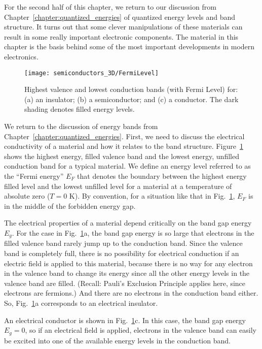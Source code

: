 For the second half of this chapter, we return to our discussion from
Chapter~\ref{chapter:quantized_energies} of quantized energy levels
and band structure. It turns out that some clever manipulations of
these materials can result in some really important electronic
components. The material in this chapter is the basis behind some of
the most important developments in modern electronics.

\begin{figure}
\begin{center}
\texttt{[image: semiconductors\_3D/FermiLevel]}
\end{center}
\caption{Highest valence and lowest conduction bands (with Fermi Level) for:
(a) an insulator; (b) a semiconductor; and (c) a conductor. The dark shading
denotes filled energy levels.}
\label{fig:FermiLevel}
\end{figure}

We return to the discussion of energy bands from 
Chapter~\ref{chapter:quantized_energies}.
First, we need to discuss the electrical conductivity of a material
and how it relates to the band structure. Figure~\ref{fig:FermiLevel}
shows the highest energy, filled valence band and the lowest energy,
unfilled conduction band for a typical material. We define an energy 
level referred to as
the ``Fermi energy'' $E_F$ that denotes the boundary between the
highest energy filled level and the lowest unfilled level for a
material at a temperature of absolute zero ($T = 0$ K). By convention,
for a situation like that in Fig.~\ref{fig:FermiLevel}, $E_F$ is in
the middle of the forbidden energy gap.

The electrical properties of a material depend critically on the band gap
energy $E_g$. For the case in Fig.~\ref{fig:FermiLevel}a, the band gap
energy is so large that electrons in the filled valence band rarely jump
up to the conduction band. Since the valence band is completely full,
there is no possibility for electrical conduction if an electric field
is applied to this material, because there is no way for any electron in
the valence band to change its energy since all the other energy levels
in the valence band are filled. (Recall: Pauli's Exclusion Principle
applies here, since electrons are fermions.) And there are no electrons
in the conduction band either. So, Fig.~\ref{fig:FermiLevel}a corresponds
to an electrical insulator.

An electrical conductor is shown in Fig.~\ref{fig:FermiLevel}c. In this
case, the band gap energy $E_g = 0$, so if an electrical field is applied, electrons
in the valence band can easily be excited into one of the available energy
levels in the conduction band.

